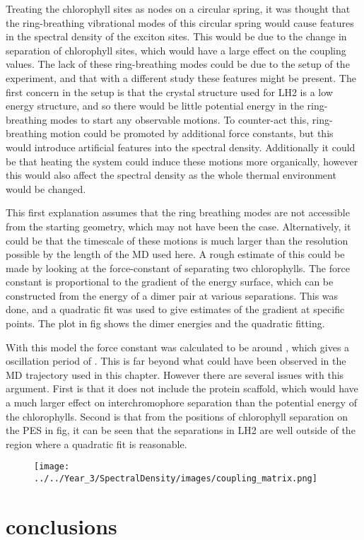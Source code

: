 Treating the chlorophyll sites as nodes on a circular spring, it was thought that
the ring-breathing vibrational modes of this circular spring would cause features
in the spectral density of the exciton sites. This would be due to the change in
separation of chlorophyll sites, which would have a large effect on the coupling
values. The lack of these ring-breathing modes could be due to the setup of the
experiment, and that with a different study these features might be present. The
first concern in the setup is that the crystal structure used for LH2 is a low 
energy structure, and so there would be little potential energy in the ring-breathing
modes to start any observable motions. To counter-act this, ring-breathing motion
could be promoted by additional force constants, but this would introduce artificial
features into the spectral density. Additionally it could be that heating the system
could induce these motions more organically, however this would also affect the 
spectral density as the whole thermal environment would be changed.

This first explanation assumes that the ring breathing modes are not accessible 
from the starting geometry, which may not have been the case. Alternatively, it
could be that the timescale of these motions is much larger than the resolution
possible by the length of the MD used here. A rough estimate of this could be made
by looking at the force-constant of separating two chlorophylls. The force constant
is proportional to the gradient of the energy surface, which can be constructed
from the energy of a dimer pair at various separations. This was done, and a quadratic
fit was used to give estimates of the gradient at specific points. The plot in fig 
shows the dimer energies and the quadratic fitting.

With this model the force constant was calculated to be around , which gives a oscillation
period of . This is far beyond what could have been observed in the MD trajectory
used in this chapter. However there are several issues with this argument. First
is that it does not include the protein scaffold, which would have a much larger
effect on interchromophore separation than the potential energy of the chlorophylls.
Second is that from the positions of chlorophyll separation on the PES in fig, it
can be seen that the separations in LH2 are well outside of the region where a quadratic
fit is reasonable.

\begin{figure}
    \texttt{[image: ../../Year\_3/SpectralDensity/images/coupling\_matrix.png]}
\end{figure}

\section{conclusions}
\label{sec:specdens_concs}

